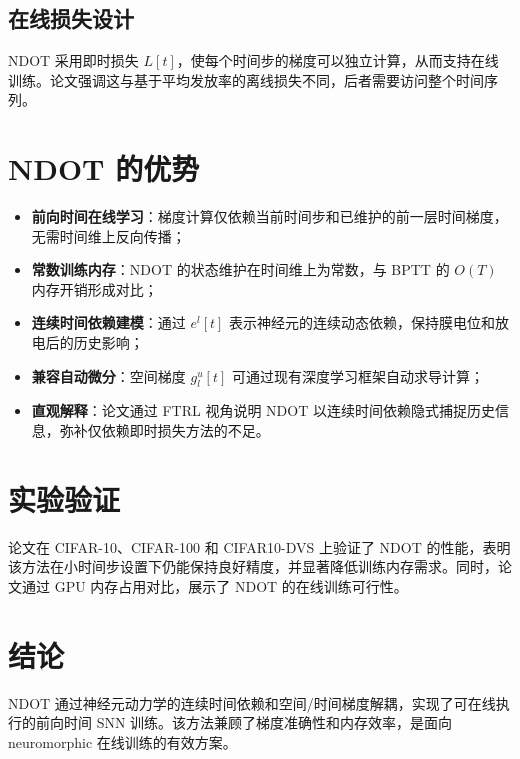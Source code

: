 \documentclass[journal,12pt,onecolumn]{IEEEtran}
\begin{document}
\subsection{在线损失设计}
NDOT 采用即时损失 $L[t]$，使每个时间步的梯度可以独立计算，从而支持在线训练。论文强调这与基于平均发放率的离线损失不同，后者需要访问整个时间序列。

\section{NDOT 的优势}
\begin{itemize}[leftmargin=*]
  \item \textbf{前向时间在线学习}：梯度计算仅依赖当前时间步和已维护的前一层时间梯度，无需时间维上反向传播；
  \item \textbf{常数训练内存}：NDOT 的状态维护在时间维上为常数，与 BPTT 的 $O(T)$ 内存开销形成对比；
  \item \textbf{连续时间依赖建模}：通过 $e^l[t]$ 表示神经元的连续动态依赖，保持膜电位和放电后的历史影响；
  \item \textbf{兼容自动微分}：空间梯度 $g^u_l[t]$ 可通过现有深度学习框架自动求导计算；
  \item \textbf{直观解释}：论文通过 FTRL 视角说明 NDOT 以连续时间依赖隐式捕捉历史信息，弥补仅依赖即时损失方法的不足。
\end{itemize}

\section{实验验证}
论文在 CIFAR-10、CIFAR-100 和 CIFAR10-DVS 上验证了 NDOT 的性能，表明该方法在小时间步设置下仍能保持良好精度，并显著降低训练内存需求。同时，论文通过 GPU 内存占用对比，展示了 NDOT 的在线训练可行性。

\section{结论}
NDOT 通过神经元动力学的连续时间依赖和空间/时间梯度解耦，实现了可在线执行的前向时间 SNN 训练。该方法兼顾了梯度准确性和内存效率，是面向 neuromorphic 在线训练的有效方案。



\end{document}
